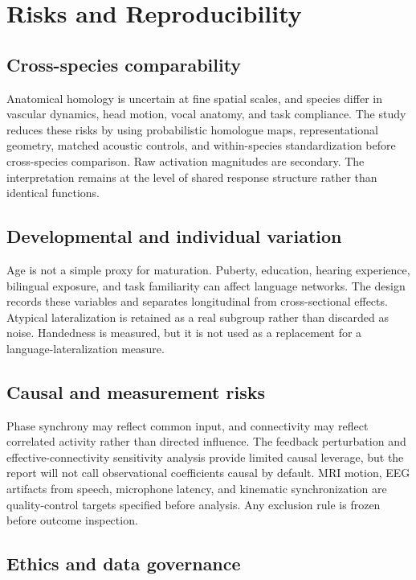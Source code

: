 \documentclass[conference]{IEEEtran}
\begin{document}
\section{Risks and Reproducibility}

\subsection{Cross-species comparability}

Anatomical homology is uncertain at fine spatial scales, and species differ in vascular dynamics, head motion, vocal anatomy, and task compliance. The study reduces these risks by using probabilistic homologue maps, representational geometry, matched acoustic controls, and within-species standardization before cross-species comparison. Raw activation magnitudes are secondary. The interpretation remains at the level of shared response structure rather than identical functions.

\subsection{Developmental and individual variation}

Age is not a simple proxy for maturation. Puberty, education, hearing experience, bilingual exposure, and task familiarity can affect language networks. The design records these variables and separates longitudinal from cross-sectional effects. Atypical lateralization is retained as a real subgroup rather than discarded as noise. Handedness is measured, but it is not used as a replacement for a language-lateralization measure.

\subsection{Causal and measurement risks}

Phase synchrony may reflect common input, and connectivity may reflect correlated activity rather than directed influence. The feedback perturbation and effective-connectivity sensitivity analysis provide limited causal leverage, but the report will not call observational coefficients causal by default. MRI motion, EEG artifacts from speech, microphone latency, and kinematic synchronization are quality-control targets specified before analysis. Any exclusion rule is frozen before outcome inspection.

\subsection{Ethics and data governance}
\end{document}
